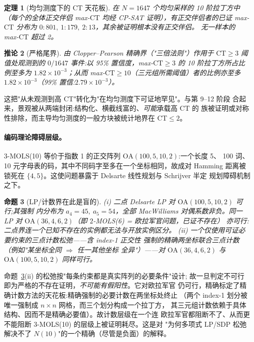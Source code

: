 \documentclass[11pt,a4paper]{ctexart}
\newtheorem{theorem}{定理}[section]
\newtheorem{corollary}[theorem]{推论}
\newtheorem{proposition}[theorem]{命题}
\theoremstyle{remark}
\newcommand{\CT}{\mathrm{CT}}
\begin{document}
\begin{theorem}[均匀测度下的 $\CT$ 天花板]\label{thm:survey-zh}
在 $N = 1647$ 个均匀采样的 10 阶拉丁方中（每个的全体正交伴侣 max-$\CT$ 均经
CP-SAT 证明），有正交伴侣者的已证 max-$\CT$ 分布为
$0\!:\!801,\ 1\!:\!179,\ 2\!:\!13$，其余被证明根本没有正交伴侣。
\emph{无一样本的 max-$\CT$ 超过 2。}
\end{theorem}

\begin{corollary}[严格尾界]\label{cor:tailbound-zh}
由 Clopper--Pearson 精确界（"三倍法则"）作用于 $\CT \geq 3$ 阈值处观测到的
$0/1647$ 事件:以 95\% 置信度，max-$\CT \geq 3$ 的 10 阶拉丁方所占比例至多为
$1.82\times10^{-3}$；从而 max-$\CT \geq 10$（三元组所需阈值）者的比例亦至多
$1.82\times10^{-3}$（99\% 置信:$2.79\times10^{-3}$）。
\end{corollary}

这把"从未观测到高 $\CT$"转化为"在均匀测度下可证地罕见"。与第 9--12 阶段
合起来，景观被从两端封闭:结构化、横截线富的、\emph{可能}承载高 $\CT$ 的
族被证明或对称性排除，而主导均匀测度的一般方块被统计地界在 $\CT\leq2$。

\paragraph{编码理论障碍层级。}
3-MOLS(10) 等价于指数 1 的正交阵列 $\mathrm{OA}(100,5,10,2)$:一个长度 5、
100 词、10 元字母表的码，其中不同码字至多在一个坐标相同，故成对 Hamming
距离被锁死在 $\{4,5\}$。这使问题暴露于 Delsarte 线性规划与 Schrijver 半定
规划障碍机制之下。

\begin{proposition}[LP/计数界在此是盲的]\label{prop:coding-zh}
{\normalfont(i)} 二点 Delsarte LP 对 $\mathrm{OA}(100,5,10,2)$ 可行;其强制
内分布为 $a_4=45,\ a_5=54$，全部 MacWilliams 对偶系数非负。\emph{同一} LP
对 $\mathrm{OA}(36,4,6,2)$（即 $2$-MOLS(6) = 欧拉军官问题，\emph{已证不存在}）
亦可行:二点界连一个已知不存在的实例都无法与开放实例区分。
{\normalfont(ii)} 一个仅使用可证必要约束的三点计数松弛——含 index-1 正交性
强制的精确两坐标联合三点计数（例如"某坐标全同 $\Rightarrow$ 任一其他坐标
全异"）——对 $\mathrm{OA}(36,4,6,2)$ 与 $\mathrm{OA}(100,5,10,2)$ 同样可行。
\end{proposition}

命题~\ref{prop:coding-zh}(ii) 的松弛按"每条约束都是真实阵列的必要条件"设计;
故一旦判定不可行即为严格的不存在证明，\emph{不可能有假阳性}。它对欧拉军官
仍可行，精确标定了精确计数方法的天花板:精确强制的必要计数在两坐标处终止
（两个 index-1 划分被唯一强制成 $n\times n$ 网格，而三个划分构成一个拉丁方，
其三元组计数依赖于具体结构、因而不是精确必要值）。故计数层级在一个连
欧拉军官都阻断不了、从而更不能阻断 3-MOLS(10) 的层级上被证明耗尽。这是对
"为何多项式 LP/SDP 松弛解决不了 $N(10)$"的一个精确（尽管是负面）的解释。
\end{document}
